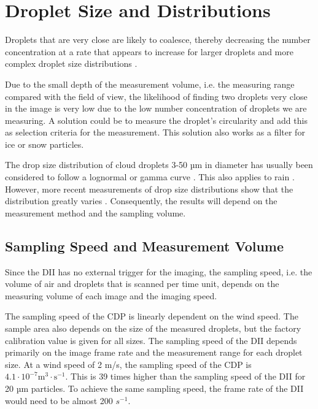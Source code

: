 \section{Droplet Size and Distributions}

Droplets that are very close are likely to coalesce, thereby decreasing the number concentration at a rate that appears to increase for larger droplets and more complex droplet size distributions \cite{borda2011}. 

Due to the small depth of the measurement volume, i.e. the measuring range compared with the field of view, the likelihood of finding two droplets very close in the image is very low due to the low number concentration of droplets we are measuring. A solution could be to measure the droplet’s circularity and add this as selection criteria for the measurement. This solution also works as a filter for ice or snow particles. 

The drop size distribution of cloud droplets 3-50 µm in diameter has usually been considered to follow a lognormal or gamma curve \cite{miles2000,lee2010,sein1998}. This also applies to rain \cite{ulb1983}. However, more recent measurements of drop size distributions show that the distribution greatly varies \cite{james2001,shaw2002,peters2005,cob2011}. Consequently, the results will depend on the measurement method and the sampling volume.

\subsection{Sampling Speed and Measurement Volume}

Since the DII has no external trigger for the imaging, the sampling speed, i.e. the volume of air and droplets that is scanned per time unit, depends on the measuring volume of each image and the imaging speed. 

The sampling speed of the CDP is linearly dependent on the wind speed. The sample area also depends on the size of the measured droplets, but the factory calibration value is given for all sizes. The sampling speed of the DII depends primarily on the image frame rate and the measurement range for each droplet size. At a wind speed of 2 m/s, the sampling speed of the CDP is $\mathrm{4.1 \cdot 10^{-7} m^{3} \cdot s^{-1}}$. This is 39 times higher than the sampling speed of the DII for 20 µm particles. To achieve the same sampling speed, the frame rate of the DII would need to be almost 200 $s^{-1}$. 

